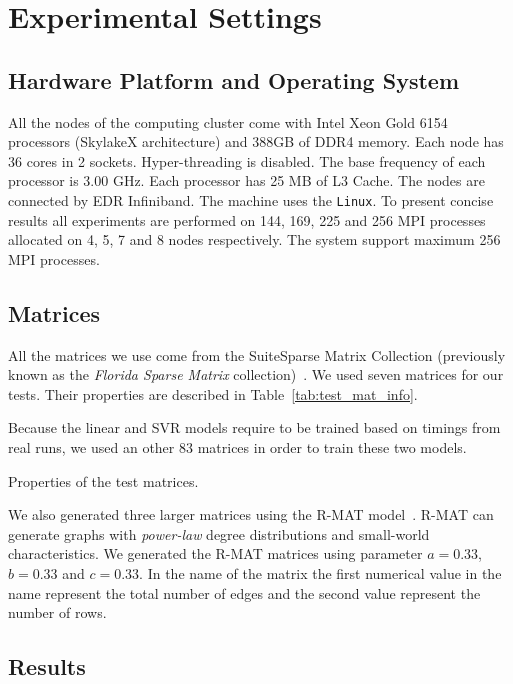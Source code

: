 \documentclass[sigconf,review,anonymous]{acmart}
\begin{document}
\section{Experimental Settings}
\subsection{Hardware Platform and Operating System}
All the nodes of the computing cluster come with Intel Xeon Gold
6154 processors (SkylakeX architecture) and 388GB of DDR4
memory. Each node has 36 cores in 2 sockets. Hyper-threading is
disabled. The base frequency of each processor is 3.00 GHz.  Each
processor has 25 MB of L3 Cache. The nodes are connected by EDR
Infiniband. The machine uses the \texttt{Linux}. To present
concise results all experiments are performed on 144, 169, 225 and 256 MPI processes
allocated on 4, 5, 7 and 8 nodes respectively. The system support maximum 256 MPI processes.

\subsection{Matrices}

All the matrices we use come from the SuiteSparse Matrix Collection
(previously known as the \textit{Florida Sparse Matrix}
collection)~\cite{Davis11}. We used seven matrices for our
tests. Their properties are described in Table~\ref{tab:test_mat_info}.

Because the linear and SVR models require to be trained based on
timings from real runs, we used an other 83 matrices in order to train
these two models.

\begin{table}[htb]
\caption{Properties of the test matrices.}
\label{tab:test_mat_info}
\let\center\empty
\let\endcenter\relax
\centering
\resizebox{.8\width}{!}{}
\end{table}

We also generated three larger matrices using the R-MAT
model~\cite{chakrabarti2004r}. R-MAT can generate graphs with
\textit{power-law} degree distributions and small-world
characteristics.  We generated the R-MAT matrices using parameter
$a=0.33$, $b=0.33$ and $c=0.33$. In the name of the matrix the first
numerical value in the name represent the total number of edges and
the second value represent the number of rows.

\subsection{Results}
\end{document}

